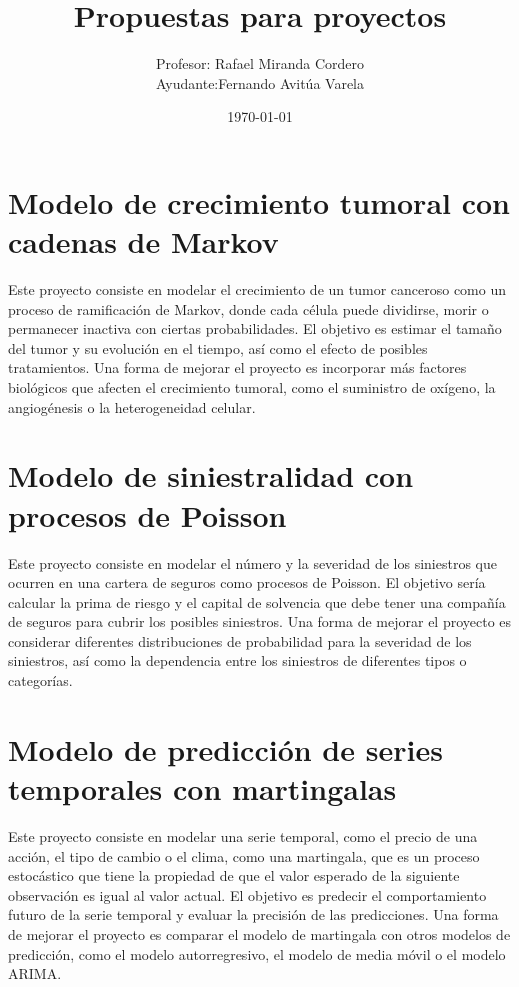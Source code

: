 \documentclass[10pt]{article}
\title{Propuestas para proyectos}
\date{\today}
\author{Profesor: Rafael Miranda Cordero\\Ayudante:Fernando Avitúa Varela}
\begin{document}
\maketitle

\section*{Modelo de crecimiento tumoral con cadenas de Markov}

Este proyecto consiste en modelar el crecimiento de un tumor canceroso como un proceso de ramificación de Markov, donde cada célula puede dividirse, morir o permanecer inactiva con ciertas probabilidades. El objetivo es estimar el tamaño del tumor y su evolución en el tiempo, así como el efecto de posibles tratamientos. Una forma de mejorar el proyecto es incorporar más factores biológicos que afecten el crecimiento tumoral, como el suministro de oxígeno, la angiogénesis o la heterogeneidad celular.

\section*{Modelo de siniestralidad con procesos de Poisson}

Este proyecto consiste en modelar el número y la severidad de los siniestros que ocurren en una cartera de seguros como procesos de Poisson. El objetivo sería calcular la prima de riesgo y el capital de solvencia que debe tener una compañía de seguros para cubrir los posibles siniestros. Una forma de mejorar el proyecto es considerar diferentes distribuciones de probabilidad para la severidad de los siniestros, así como la dependencia entre los siniestros de diferentes tipos o categorías.

\section*{Modelo de predicción de series temporales con martingalas}

Este proyecto consiste en modelar una serie temporal, como el precio de una acción, el tipo de cambio o el clima, como una martingala, que es un proceso estocástico que tiene la propiedad de que el valor esperado de la siguiente observación es igual al valor actual. El objetivo es predecir el comportamiento futuro de la serie temporal y evaluar la precisión de las predicciones. Una forma de mejorar el proyecto es comparar el modelo de martingala con otros modelos de predicción, como el modelo autorregresivo, el modelo de media móvil o el modelo ARIMA.
\end{document}
